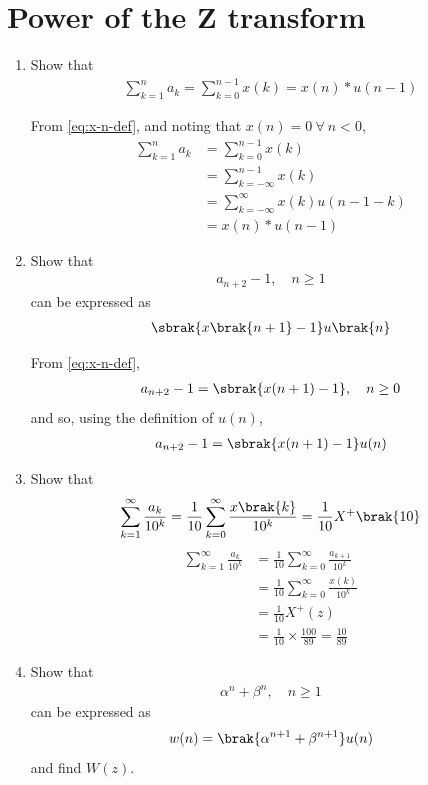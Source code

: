 \documentclass[journal,12pt,twocolumn]{IEEEtran}
\renewcommand\thesection{\arabic{section}}
\begin{document}
\section{Power of the Z transform}
\begin{enumerate}[label=\thesection.\arabic*,ref=\thesection.\theenumi]
\item Show that 
\begin{align}
	\sum_{k=1}^{n}a_k = 
	\sum_{k=0}^{n-1}x(k) = x(n)*u(n-1)
\end{align}

\solution From \eqref{eq:x-n-def}, and noting that $x(n) = 0\ \forall\ n < 0$,
\begin{align}
    \sum_{k=1}^{n}a_k &= \sum_{k=0}^{n-1}x(k) \\
                      &= \sum_{k = -\infty}^{n - 1}x(k) \\
                      &= \sum_{k = -\infty}^{\infty}x(k)u(n - 1 - k) \\
                      &= x(n)*u(n - 1)
\end{align}
\item Show that 
\begin{align}
a_{n+2}-1, \quad n \ge 1
\end{align}
can be expressed as 
\begin{align}
	\sbrak{x\brak{n+1}-1}u\brak{n}
\end{align}

\solution From \eqref{eq:x-n-def},
\begin{align}
    a_{n+2} - 1 = \sbrak{x(n + 1) - 1}, \quad n \ge 0
\end{align}
and so, using the definition of $u(n)$,
\begin{align}
    a_{n+2} - 1 = \sbrak{x(n + 1) - 1}u(n)
\end{align}

\item Show that 
\begin{align}
	\sum_{k=1}^{\infty}\frac{a_k}{10^k}= 
	\frac{1}{10}\sum_{k=0}^{\infty}\frac{x\brak{k}}{10^k} =\frac{1}{10}X^{+}\brak{{10}}
\end{align}
\label{pr:1-2}
\solution 
\begin{align}
    \sum_{k=1}^{\infty}\frac{a_k}{10^k} &= \frac{1}{10}\sum_{k = 0}^{\infty}\frac{a_{k+1}}{10^k} \\
                                        &= \frac{1}{10}\sum_{k = 0}^{\infty}\frac{x(k)}{10^k} \\
                                        &= \frac{1}{10}X^+(z) \\
                                        &= \frac{1}{10}\times\frac{100}{89} = \frac{10}{89}
\end{align}
\item Show that 
\begin{align}
	\alpha^n + \beta^n, \quad n \ge 1
    \label{eq:yn-exp}
\end{align}
can be expressed as 
\begin{align}
	w(n) = \brak{\alpha^{n+1} + \beta^{n+1}}u(n)
\end{align}
and find $W(z)$.


\end{enumerate}
\end{document}

